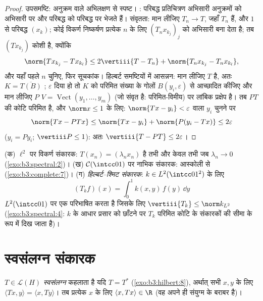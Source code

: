 \begin{proof}
उपसमष्टि: अनुक्रम वाले अभिलक्षण से स्पष्ट। : परिबद्ध
प्रतिचित्रण अभिसारी अनुक्रमों को अभिसारी पर और परिबद्ध को परिबद्ध
पर भेजते हैं। संवृतता: मान लीजिए $T_n \to T$, जहाँ $T_n$  हैं, और
$1$ से परिबद्ध $(x_k)$; कोई विकर्ण निष्कर्षण प्रत्येक $n$ के लिए
$(T_nx_{k_j})_j$ को अभिसारी बना देता है; तब $(Tx_{k_j})$ कोशी है, क्योंकि
\[
\norm{Tx_{k_j} - Tx_{k_l}} \leq 2\vertiii{T - T_n} +
\norm{T_nx_{k_j} - T_nx_{k_l}} ,
\]
और यहाँ पहले $n$ चुनिए, फिर सूचकांक। हिल्बर्ट समष्टियों में
आसन्नन: मान लीजिए $T$  है, अतः $K = \overline{T(B)}$ ; $\varepsilon$ दिया हो तो
$K$ को परिमित संख्या के गोलों $B(y_i, \varepsilon)$ से आच्छादित कीजिए और मान लीजिए
$P$ $V = \operatorname{Vect}(y_1, \dots, y_m)$ (जो संवृत है: परिमित-विमीय) पर लांबिक प्रक्षेप है। तब
$PT$ की कोटि परिमित है, और $\norm x \leq 1$ के लिए: $\norm{Tx - y_i} <
\varepsilon$ वाला $y_i$ चुनने पर
\[
\norm{Tx - PTx} \leq \norm{Tx - y_i} + \norm{P(y_i - Tx)}
\leq 2\varepsilon
\]
($y_i = Py_i$; $\vertiii P \leq 1$): अतः $\vertiii{T - PT} \leq
2\varepsilon$।
\end{proof}

\begin{example}\label{ex:b3:spectral:examples}
(क) $\ell^2$ पर विकर्ण संकारक: $T(x_n) = (\lambda_nx_n)$  है तभी और केवल तभी जब $\lambda_n \to 0$
(\cref{exo:b3:spectral:2})।
(ख) $\mathcal C(\intcc01)$ पर नाभिक संकारक: आस्कोली से  (\cref{exo:b3:complete:7})।
(ग) \emph{हिल्बर्ट--श्मिट संकारक}:
$k \in L^2(\intcc01^2)$ के लिए
\[
(T_kf)(x) = \int_0^1k(x, y)\,f(y)\,\dd y
\]
$L^2(\intcc01)$ पर एक  परिभाषित करता है जिसके लिए
$\vertiii{T_k} \leq \norm k_{L^2}$
(\cref{exo:b3:spectral:4}: $k$ के आधार प्रसार को छाँटने पर $T_k$ परिमित कोटि के
संकारकों की सीमा के रूप में दिख जाता है)।
\end{example}

\section{स्वसंलग्न संकारक}

\begin{definition}\label{def:b3:spectral:selfadjoint}
$T \in \mathcal L(H)$ \emph{स्वसंलग्न} कहलाता है यदि $T = T^*$
(\cref{exo:b3:hilbert:8}), अर्थात् सभी $x, y$ के लिए $\langle Tx, y\rangle = \langle x, Ty\rangle$। तब प्रत्येक $x$ के लिए
$\langle x, Tx\rangle \in \R$ (वह अपने ही संयुग्म के बराबर है)।
\end{definition}

